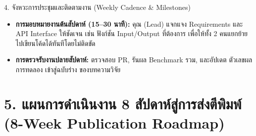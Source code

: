 \documentclass[10pt,a4paper]{article}
\begin{document}
\vspace{3pt}
\begin{infobox}{4. จังหวะการประชุมและติดตามงาน (Weekly Cadence \& Milestones)}
  \begin{itemize}[leftmargin=12pt, itemsep=1.5pt, topsep=1pt, parsep=0pt]
    \item \textbf{การมอบหมายงานต้นสัปดาห์ (15--30 นาที):} คุณ (Lead) แจกแจง Requirements และ API Interface ให้ชัดเจน เช่น ฟังก์ชัน Input/Output ที่ต้องการ เพื่อให้ทั้ง 2 คนแยกย้ายไปเขียนโค้ดได้ทันทีโดยไม่ติดขัด
    \item \textbf{การตรวจรับงานปลายสัปดาห์:} ตรวจสอบ PR, รันผล Benchmark รวม, และอัปเดต ตัวเลขผลการทดลอง เข้าสู่ฉบับร่าง ของบทความวิจัย
  \end{itemize}
\end{infobox}

\newpage

\section*{\textcolor{secondary}{\large 5. แผนการดำเนินงาน 8 สัปดาห์สู่การส่งตีพิมพ์ (8-Week Publication Roadmap)}}
\vspace{-4pt}
\end{document}
